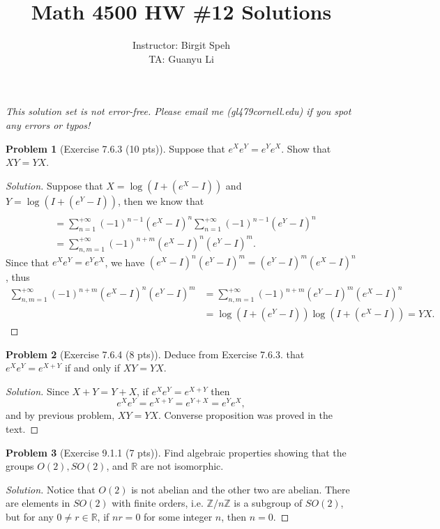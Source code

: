 \documentclass{article}
\title{Math 4500 HW \#12 Solutions}
\author{Instructor: Birgit Speh\\ TA: Guanyu Li}
\date{}
\theoremstyle{definition}
\newtheorem{problem}{Problem}
\theoremstyle{plain}
\begin{document}
\maketitle\par

\emph{This solution set is not error-free. Please email me (gl479\MVAt cornell.edu) if you spot any errors or typos!}

\begin{problem}[Exercise 7.6.3 (10 pts)]
Suppose that $e^Xe^Y=e^Ye^X$. Show that $XY=YX$.
\end{problem}
\begin{adjustwidth}{0.7cm}{}
\color{blue}
\begin{proof}[Solution]
Suppose that $X=\log(I+(e^X-I))$ and $Y=\log(I+(e^Y-I))$, then we know that
\begin{align*}
\\
&=\sum_{n=1}^{+\infty}(-1)^{n-1}(e^X-I)^n\sum_{n=1}^{+\infty}(-1)^{n-1}(e^Y-I)^n\\
&=\sum_{n,m=1}^{+\infty}(-1)^{n+m}(e^X-I)^n(e^Y-I)^m.
\end{align*}
Since that $e^Xe^Y=e^Ye^X$, we have $(e^X-I)^n(e^Y-I)^m=(e^Y-I)^m(e^X-I)^n$, thus
\begin{align*}
\sum_{n,m=1}^{+\infty}(-1)^{n+m}(e^X-I)^n(e^Y-I)^m&=\sum_{n,m=1}^{+\infty}(-1)^{n+m}(e^Y-I)^m(e^X-I)^n\\
&=\log(I+(e^Y-I))\log(I+(e^X-I))=YX.
\end{align*}
\color{black}
\end{proof}
\end{adjustwidth}

\begin{problem}[Exercise 7.6.4 (8 pts)]
Deduce from Exercise 7.6.3. that $e^Xe^Y=e^{X+Y}$ if and only if $XY=YX$.
\end{problem}
\begin{adjustwidth}{0.7cm}{}
\color{blue}
\begin{proof}[Solution]
Since $X+Y=Y+X$, if $e^Xe^Y=e^{X+Y}$ then
\begin{displaymath}
e^Xe^Y=e^{X+Y}=e^{Y+X}=e^Ye^X,
\end{displaymath}
and by previous problem, $XY=YX$. Converse proposition was proved in the text.
\color{black}
\end{proof}
\end{adjustwidth}

\begin{problem}[Exercise 9.1.1 (7 pts)]
Find algebraic properties showing that the groups $O(2),SO(2)$, and $\mathbb{R}$ are not isomorphic.
\end{problem}
\begin{adjustwidth}{0.7cm}{}
\color{blue}
\begin{proof}[Solution]
Notice that $O(2)$ is not abelian and the other two are abelian. There are elements in $SO(2)$ with finite orders, i.e. $\mathbb{Z}/n\mathbb{Z}$ is a subgroup of $SO(2)$, but for any $0\neq r\in\mathbb{R}$, if $nr=0$ for some integer $n$, then $n=0$.
\color{black}
\end{proof}
\end{adjustwidth}
\end{document}
